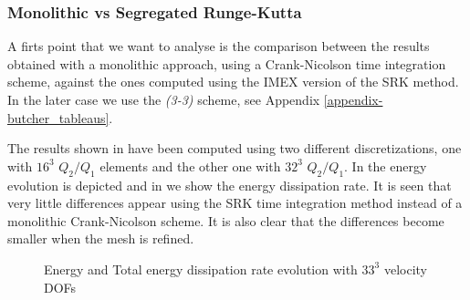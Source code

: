 \subsubsection{Monolithic vs Segregated Runge-Kutta}
\label{subsubsec-C7_TGV_mono_vs_SRK}
A firts point that we want to analyse is the comparison between the results obtained with a monolithic approach, using a Crank-Nicolson time integration scheme, against the ones computed using the IMEX version of the SRK method. In the later case we use the \textit{(3-3)} scheme, see Appendix \ref{appendix-butcher_tableaus}.  

The results shown in  have been computed using two different discretizations, one with $16^3$ $Q_2/Q_1$ elements and the other one with $32^3$ $Q_2/Q_1$. In  the energy evolution is depicted and in  we show the energy dissipation rate. It is seen that very little differences appear using the SRK time integration method instead of a monolithic Crank-Nicolson scheme. It is also clear that the differences become smaller when the mesh is refined.
\begin{figure}[h!]
  \centering
  \caption{Energy and Total energy dissipation rate evolution with $33^3$ velocity DOFs}
  \label{fig-TGV_SRK_mono_ene_dis}
\end{figure}

